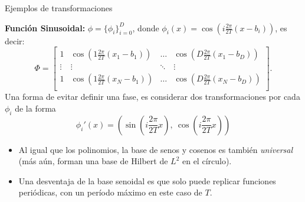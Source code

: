 \documentclass[9pt]{beamer}
\begin{document}
\begin{frame}{Ejemplos de transformaciones}

\noindent\textbf{Función Sinusoidal:} $\phi=\{\phi_i\}_{i=0}^D$, donde $\phi_i(x)=\cos\left(i\frac{2\pi}{2T}(x - b_i)\right)$, es decir:
\begin{equation*}
    \Phi = \left[ \begin{matrix}
    1 & \cos\left(1\frac{2\pi}{2T}(x_1-b_1)\right) & \ldots & \cos\left(D\frac{2\pi}{2T}(x_1-b_D)\right)\\
    \vdots & \vdots  & \ddots & \vdots \\
    1 & \cos\left(1\frac{2\pi}{2T}(x_N-b_1)\right) & \ldots & \cos\left(D\frac{2\pi}{2T}(x_N-b_D)\right)\\
    \end{matrix} \right].
\end{equation*}\pause
Una forma de evitar definir una fase, es considerar dos transformaciones por cada $\phi_i$ de la forma
\begin{equation*}
    \phi_i'(x) = \left(\sin\left(i\frac{2\pi}{2T}x\right),\ \cos\left(i\frac{2\pi}{2T}x\right)\right)
\end{equation*}\pause

\begin{itemize}
	\item Al igual que los polinomios, la base de senos y cosenos es también \emph{universal} (más aún, forman una base de Hilbert de $L^2$ en el círculo).\pause
	\item Una desventaja de la base senoidal es que solo puede replicar funciones periódicas, con un período máximo en este caso  de $T$.
\end{itemize}

\end{frame}
\end{document}
